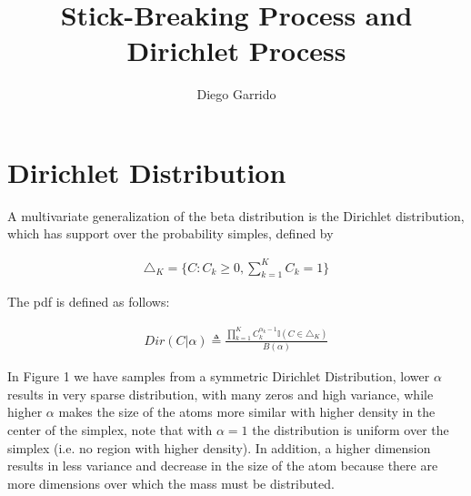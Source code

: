 \documentclass{article}
\title{Stick-Breaking Process and Dirichlet Process}
\author{Diego Garrido}
\begin{document}
\maketitle
\href{https://nbviewer.jupyter.org/github/dgarridoa/dirichlet_process/blob/master/Dirichlet_Process.ipynb}{\color{blue}{Jupyter Notebook}}
\section{Dirichlet Distribution}

A multivariate generalization of the beta distribution is the Dirichlet distribution, which has support over the probability simples, defined by

\begin{align}
\triangle_{K} = \{C: C_{k}\geq 0, \sum_{k=1}^{K}C_{k}=1\}
\end{align}

The pdf is defined as follows:

\begin{align}
Dir(C|\alpha) \triangleq \frac{\prod_{k=1}^{K}C_{k}^{\alpha_{k}-1}\mathbb{I}(C \in \triangle_{K})}{B(\alpha)}
\end{align}

In Figure 1 we have samples from a symmetric Dirichlet Distribution, lower $\alpha$ results in very sparse distribution, with many zeros and high variance, while higher $\alpha$ makes the size of the atoms more similar with higher density in the center of the simplex, note that with $\alpha=1$ the distribution is uniform over the simplex (i.e. no region with higher density). In addition, a higher dimension results in less variance and decrease in the size of the atom because there are more dimensions over which the mass must be distributed.\\
\end{document}
